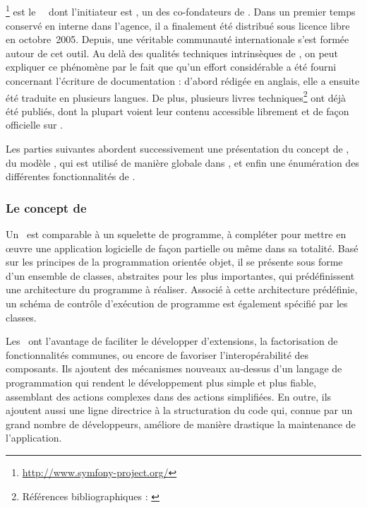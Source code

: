 \subsection{\asf}
\label{section:outils_sf}

\asf\footnote{\url{http://www.symfony-project.org/}} est le \afm\ \aphp\ dont l'initiateur est \apotencier, un des co-fondateurs de \asl. Dans un premier temps conservé en interne dans l'agence, il a finalement été distribué sous licence libre en octobre~2005. Depuis, une véritable communauté internationale s'est formée autour de cet outil. Au delà des qualités techniques intrinsèques de \asf, on peut expliquer ce phénomène par le fait que qu'un effort considérable a été fourni concernant l'écriture de documentation : d'abord rédigée en anglais, elle a ensuite été traduite en plusieurs langues. De plus, plusieurs livres techniques\footnote{Références bibliographiques : \cite{practicalsf} \cite{sfrefguide} \cite{cahierssf} \cite{moresf} \cite{thebook}} ont déjà été publiés, dont la plupart voient leur contenu accessible librement et de façon officielle sur \ainternet.

Les parties suivantes abordent successivement une présentation du concept de \afm, du modèle \amvc, qui est utilisé de manière globale dans \asf, et enfin une énumération des différentes fonctionnalités de \asf.


\subsubsection{Le concept de \afm}

Un \afm\ est comparable à un squelette de programme, à compléter pour mettre en œuvre une application logicielle de façon partielle ou même dans sa totalité. Basé sur les principes de la programmation orientée objet, il se présente sous forme d'un ensemble de classes, abstraites pour les plus importantes, qui prédéfinissent une architecture du programme à réaliser. Associé à cette architecture prédéfinie, un schéma de contrôle d'exécution de programme est également spécifié par les classes.

Les \afms\ ont l'avantage de faciliter le développer d'extensions, la factorisation de fonctionnalités communes, ou encore de favoriser l'interopérabilité des composants. Ils ajoutent des mécanismes nouveaux au-dessus d'un langage de programmation qui rendent le développement plus simple et plus fiable, assemblant des actions complexes dans des actions simplifiées. En outre, ils ajoutent aussi une ligne directrice à la structuration du code qui, connue par un grand nombre de développeurs, améliore de manière drastique la maintenance de l'application.

